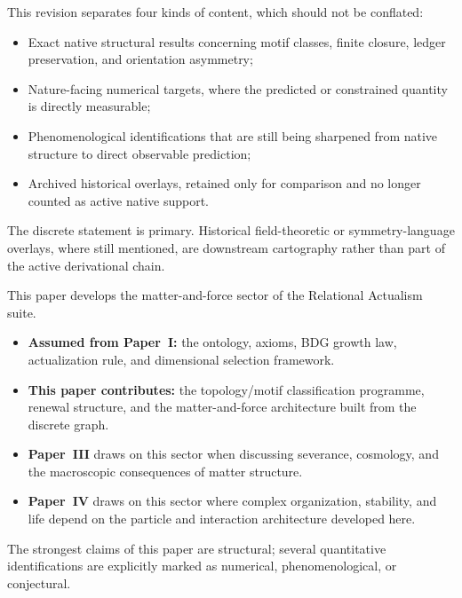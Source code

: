 \documentclass[11pt]{article}
\begin{document}
\begin{tcolorbox}[title=Epistemic Status of Results in This Paper,colback=gray!5,colframe=gray!60]
This revision separates four kinds of content, which should not be conflated:
\begin{itemize}[nosep]
    \item Exact native structural results concerning motif classes, finite closure, ledger preservation, and orientation asymmetry;
    \item Nature-facing numerical targets, where the predicted or constrained quantity is directly measurable;
    \item Phenomenological identifications that are still being sharpened from native structure to direct observable prediction;
    \item Archived historical overlays, retained only for comparison and no longer counted as active native support.
\end{itemize}
The discrete statement is primary. Historical field-theoretic or symmetry-language overlays, where still mentioned, are downstream cartography rather than part of the active derivational chain.
\end{tcolorbox}

\begin{tcolorbox}[title=Place of This Paper in the RA Suite,colback=gray!5,colframe=gray!60]
This paper develops the matter-and-force sector of the Relational Actualism suite.
\begin{itemize}[nosep]
    \item \textbf{Assumed from Paper~I:} the ontology, axioms, BDG growth law, actualization rule, and dimensional selection framework.
    \item \textbf{This paper contributes:} the topology/motif classification programme, renewal structure, and the matter-and-force architecture built from the discrete graph.
    \item \textbf{Paper~III} draws on this sector when discussing severance, cosmology, and the macroscopic consequences of matter structure.
    \item \textbf{Paper~IV} draws on this sector where complex organization, stability, and life depend on the particle and interaction architecture developed here.
\end{itemize}
The strongest claims of this paper are structural; several quantitative identifications are explicitly marked as numerical, phenomenological, or conjectural.
\end{tcolorbox}
\end{document}
